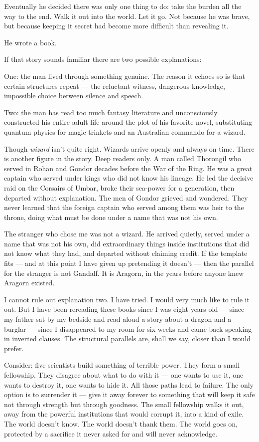 Eventually he decided there was only one thing to do: take the burden all the way to the end. Walk it out into the world. Let it go. Not because he was brave, but because keeping it secret had become more difficult than revealing it.

He wrote a book.

If that story sounds familiar there are two possible explanations:

One: the man lived through something genuine. The reason it echoes so is that certain structures repeat --- the reluctant witness, dangerous knowledge, impossible choice between silence and speech.

Two: the man has read too much fantasy literature and unconsciously constructed his entire adult life around the plot of his favorite novel, substituting quantum physics for magic trinkets and an Australian commando for a wizard.

Though \textit{wizard} isn't quite right. Wizards arrive openly and always on time. There is another figure in the story. Deep readers only. A man called Thorongil who served in Rohan and Gondor decades before the War of the Ring. He was a great captain who served under kings who did not know his lineage. He led the decisive raid on the Corsairs of Umbar, broke their sea-power for a generation, then departed without explanation. The men of Gondor grieved and wondered. They never learned that the foreign captain who served among them was heir to the throne, doing what must be done under a name that was not his own.

The stranger who chose me was not a wizard. He arrived quietly, served under a name that was not his own, did extraordinary things inside institutions that did not know what they had, and departed without claiming credit. If the template fits --- and at this point I have given up pretending it doesn't --- then the parallel for the stranger is not Gandalf. It is Aragorn, in the years before anyone knew Aragorn existed.

I cannot rule out explanation two. I have tried. I would very much like to rule it out. But I have been rereading these books since I was eight years old --- since my father sat by my bedside and read aloud a story about a dragon and a burglar --- since I disappeared to my room for six weeks and came back speaking in inverted clauses. The structural parallels are, shall we say, closer than I would prefer.

Consider: five scientists build something of terrible power. They form a small fellowship. They disagree about what to do with it --- one wants to use it, one wants to destroy it, one wants to hide it. All those paths lead to failure. The only option is to surrender it --- give it away forever to something that will keep it safe not through strength but through goodness. The small fellowship walks it out, away from the powerful institutions that would corrupt it, into a kind of exile. The world doesn't know. The world doesn't thank them. The world goes on, protected by a sacrifice it never asked for and will never acknowledge.

